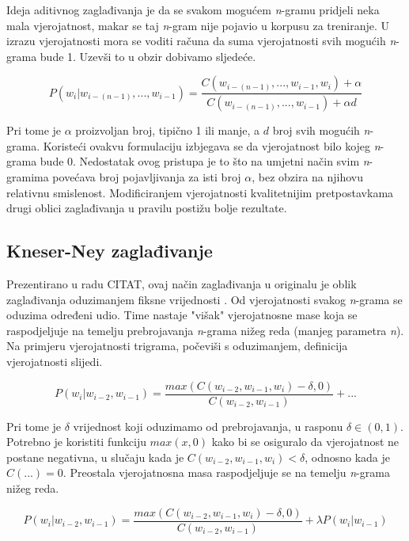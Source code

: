 \documentclass[times, utf8, diplomski, numeric]{fer}
\begin{document}
Ideja aditivnog zaglađivanja je da se svakom mogućem \textit{n}-gramu pridjeli neka mala vjerojatnost, makar se taj \textit{n}-gram nije pojavio u korpusu za treniranje. U izrazu vjerojatnosti mora se voditi računa da suma vjerojatnosti svih mogućih \textit{n}-grama bude 1. Uzevši to u obzir dobivamo sljedeće.

\[
P(w_i | w_{i - (n - 1)}, ... , w_{i - 1}) = \frac{C(w_{i - (n - 1)}, ... , w_{i - 1}, w_i) + \alpha}{C(w_{i - (n - 1)}, ... , w_{i - 1}) + \alpha d}
\]

Pri tome je $\alpha$ proizvoljan broj, tipično 1 ili manje, a $d$ broj svih mogućih \textit{n}-grama. Koristeći ovakvu formulaciju izbjegava se da vjerojatnost bilo kojeg \textit{n}-grama bude 0. Nedostatak ovog pristupa je to što na umjetni način svim \textit{n}-gramima povećava broj pojavljivanja za isti broj $\alpha$, bez obzira na njihovu relativnu smislenost. Modificiranjem vjerojatnosti kvalitetnijim pretpostavkama drugi oblici zaglađivanja u pravilu postižu bolje rezultate.

\subsection{Kneser-Ney zaglađivanje}

Prezentirano u radu CITAT, ovaj način zaglađivanja u originalu je oblik zaglađivanja oduzimanjem fiksne vrijednosti . Od vjerojatnosti svakog \textit{n}-grama se oduzima određeni udio. Time nastaje "višak" vjerojatnosne mase koja se raspodjeljuje na temelju prebrojavanja \textit{n}-grama nižeg reda (manjeg parametra \textit{n}). Na primjeru vjerojatnosti trigrama, počeviši s oduzimanjem, definicija vjerojatnosti slijedi.

\[
P(w_i | w_{i - 2}, w_{i - 1}) =
  \frac{max\left(C(w_{i - 2}, w_{i - 1}, w_i) - \delta, 0\right)}
    {C(w_{i - 2}, w_{i - 1})} + ...
\]

Pri tome je $\delta$ vrijednost koji oduzimamo od prebrojavanja, u rasponu $\delta \in (0, 1)$. Potrebno je koristiti funkciju $max(x, 0)$ kako bi se osiguralo da vjerojatnost ne postane negativna, u slučaju kada je $C(w_{i - 2}, w_{i - 1}, w_i) < \delta$, odnosno kada je $C(...) = 0$. Preostala vjerojatnosna masa raspodjeljuje se na temelju \textit{n}-grama nižeg reda.

\[
P(w_i | w_{i - 2}, w_{i - 1}) =
  \frac{max\left(C(w_{i - 2}, w_{i - 1}, w_i) - \delta, 0\right)}
    {C(w_{i - 2}, w_{i - 1})} + \lambda P(w_i | w_{i - 1})
\]
\end{document}
